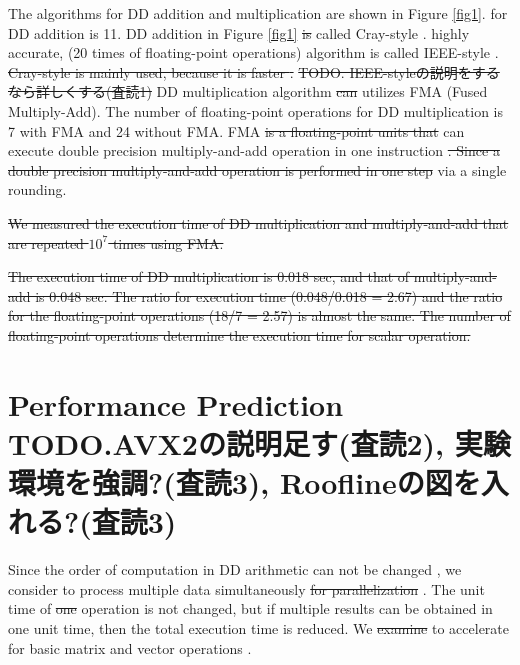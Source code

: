 \documentclass{IOS-Book-Article}
\begin{document}
The algorithms for DD addition and multiplication are shown in Figure \ref{fig1}.
{\color{mur}{The number of floating-point number operations}} for DD addition is 11. DD addition in Figure \ref{fig1} \sout{is} called Cray-style \cite{ichi}. {\color{blue}{There is a}} highly accurate, {\color{blue}{and more expensive (refree1,3)}} (20 times of floating-point operations) algorithm is called IEEE-style \cite{ichi}. \sout{Cray-style is mainly used, because it is faster \cite{DDBLAS}.} \sout{TODO. IEEE-styleの説明をするなら詳しくする(査読1)}
DD multiplication algorithm \cite{QD} \sout{can} utilizes FMA (Fused Multiply-Add). 
The number of floating-point {\color{blue}{number}} operations for DD multiplication is 7 with FMA and 24 without FMA.
FMA \sout{is a floating-point units that} can execute double precision multiply-and-add operation in one instruction \sout{. Since a double precision multiply-and-add operation is performed in one step} via a single rounding. {\color{mid}{By using FMA instructions, the rounding error is reduced.}} {\color{mur}{The number of floating-point number operations for DD multiply-add operation is 18 (=11+7). }}



\sout{We measured the execution time of DD multiplication and multiply-and-add that are repeated $10^7$ times using FMA.}
 

\sout{The execution time of DD multiplication is 0.018 sec, and that of multiply-and-add is 0.048 sec. The ratio for execution time (0.048/0.018 = 2.67) and the ratio for the floating-point operations (18/7 = 2.57) is almost the same. The number of floating-point operations determine the execution time for scalar operation.}

\section{Performance Prediction TODO.AVX2の説明足す(査読2), 実験環境を強調?(査読3), Rooflineの図を入れる?(査読3)}
Since the order of computation in DD arithmetic can not be changed {\color{mur}{for acceleration}}, we consider to process multiple data simultaneously \sout{for parallelization} {\color{blue}{by using data-level parallelism}}.
The unit time of \sout{one} {\color{blue}{each}} operation is not changed, but if multiple results can be obtained in one unit time, then the total execution time is reduced.
We \sout{examine} {\color{blue}{tried}} to accelerate for basic matrix and vector operations {\color{mur}{as the target for data-level parallelism}}.
\end{document}
